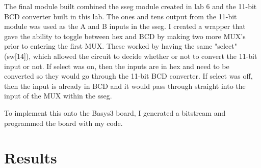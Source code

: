 \documentclass[11pt]{article}
\begin{document}
The final module built combined the sseg module created in lab 6 and the 11-bit BCD converter built in this lab. The ones and tens output from the 11-bit module was used as the A and B inputs in the sseg. I created a wrapper that gave the ability to toggle between hex and BCD by making two more MUX's prior to entering the first MUX. These worked by having the same "select" (sw[14]), which allowed the circuit to decide whether or not to convert the 11-bit input or not. If select was on, then the inputs are in hex and need to be converted so they would go through the 11-bit BCD converter. If select was off, then the input is already in BCD and it would pass through straight into the input of the MUX within the sseg. 

To implement this onto the Basys3 board, I generated a bitstream and programmed the board with my code.



\section*{Results}

\FloatBarrier
\end{document}
